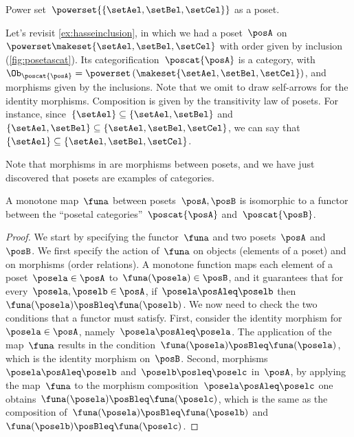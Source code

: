 \begin{marginfigure}
	\centering
	\caption{Power set~$\powerset{\{\setAel,\setBel,\setCel\}}$ as a poset. \label{fig:posetascat}}
\end{marginfigure}

\begin{example}
	Let's revisit \cref{ex:hasseinclusion}, in which we had a poset~$\posA$ on $\powerset \makeset{\setAel,\setBel,\setCel}$ with order given by inclusion (\cref{fig:posetascat}).
	Its categorification~$\poscat{\posA}$ is a category, with $\Ob_{\poscat{\posA}}=\powerset\left(\makeset{\setAel,\setBel,\setCel}\right)$, and morphisms given by the inclusions.
	Note that we omit to draw self-arrows for the identity morphisms.
	Composition is given by the transitivity law of posets.
	For instance, since~$\{\setAel\}\subseteq \{\setAel,\setBel\}$ and~$\{\setAel,\setBel\} \subseteq \{\setAel,\setBel,\setCel\}$, we can say that~$\{\setAel\}\subseteq \{\setAel,\setBel,\setCel\}$.
\end{example}



Note that morphisms in \Pos are morphisms between posets, and we have just discovered that posets are examples of categories.
\begin{lemma}
	\label{lem:posetfunctor}
	A monotone map~$\funa$ between posets~$\posA,\posB$ is isomorphic to a functor between the ``posetal categories''~$\poscat{\posA}$ and~$\poscat{\posB}$.
\end{lemma}
\begin{proof}
	We start by specifying the functor~$\funa$ and two posets~$\posA$ and~$\posB$.
	We first specify the action of~$\funa$ on objects (elements of a poset) and on morphisms (order relations).
	A monotone function maps each element of a poset~$\posela\in \posA$ to~$\funa(\posela) \in \posB$, and it guarantees that for every~$\posela,\poselb\in \posA$, if~$\posela\posAleq \poselb$ then~$\funa(\posela)\posBleq \funa(\poselb)$.
	We now need to check the two conditions that a functor must satisfy.
	First, consider the identity morphism for~$\posela\in \posA$, namely~$\posela \posAleq \posela$.
	The application of the map~$\funa$ results in the condition~$\funa(\posela)\posBleq \funa(\posela)$, which is the identity morphism on~$\posB$.
	Second, morphisms~$\posela\posAleq \poselb$ and~$\poselb\posleq \poselc$ in~$\posA$, by applying the map~$\funa$ to the morphism composition~$\posela\posAleq \poselc$ one obtains~$\funa(\posela)\posBleq \funa(\poselc)$, which is the same as the composition of~$\funa(\posela)\posBleq \funa(\poselb)$ and~$\funa(\poselb)\posBleq \funa(\poselc)$.
\end{proof}


